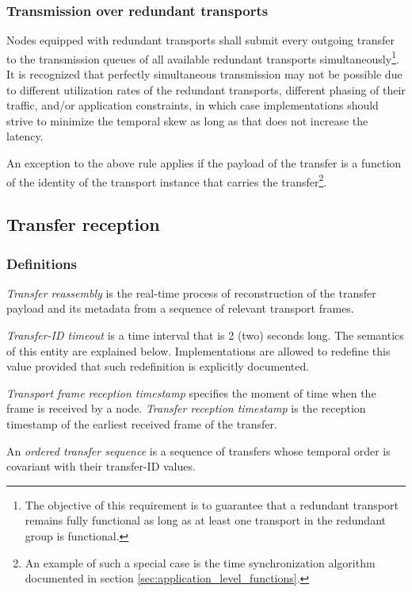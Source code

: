 \subsubsection{Transmission over redundant transports}

Nodes equipped with redundant transports shall submit every outgoing transfer to the transmission queues of all
available redundant transports simultaneously\footnote{%
    The objective of this requirement is to guarantee that a redundant transport remains fully functional
    as long as at least one transport in the redundant group is functional.
}.
It is recognized that perfectly simultaneous transmission may not be possible due to different
utilization rates of the redundant transports, different phasing of their traffic, and/or application constraints,
in which case implementations should strive to minimize the temporal skew as long as that
does not increase the latency.

An exception to the above rule applies if the payload of the transfer is a function of
the identity of the transport instance that carries the transfer\footnote{%
    An example of such a special case is the time synchronization algorithm documented in section
    \ref{sec:application_level_functions}.
}.

\subsection{Transfer reception}

\subsubsection{Definitions}

\emph{Transfer reassembly} is the real-time process of reconstruction of the transfer payload and its metadata from
a sequence of relevant transport frames.

\emph{Transfer-ID timeout} is a time interval that is 2 (two) seconds long.
The semantics of this entity are explained below.
Implementations are allowed to redefine this value provided that such redefinition is explicitly documented.

\emph{Transport frame reception timestamp} specifies the moment of time when the frame is received by a node.
\emph{Transfer reception timestamp} is the reception timestamp of the earliest received frame of the transfer.

An \emph{ordered transfer sequence} is a sequence of transfers whose temporal order is
covariant with their transfer-ID values.

